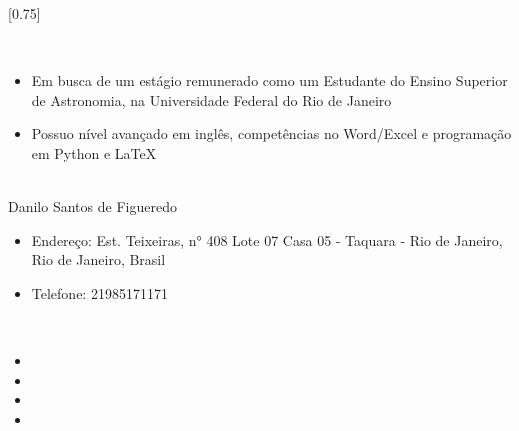 \documentclass[Personalized]{simplehipstercv}
\begin{document}
\setlength{\columnsep}{1.5cm}
[0.75]
\begin{paracol}{2}

\paracolbackgroundoptions



\footnotesize
{\setasidefontcolour
\flushright
\begin{center}
\end{center}

\\[0.5em]

\begin{itemize}
    \item Em busca de um estágio remunerado como um Estudante do Ensino Superior de Astronomia, na Universidade Federal do Rio de Janeiro
    \item Possuo nível avançado em inglês, competências no Word/Excel e programação em Python e LaTeX


\end{itemize}

\bigskip

 \\[0.5em]
Danilo Santos de Figueredo
\begin{itemize}
    \item Endereço: Est. Teixeiras, n° 408 Lote 07 Casa 05 - Taquara - Rio de Janeiro, Rio de Janeiro, Brasil
    \item Telefone: 21985171171

\end{itemize}



\bigskip

 \\[0.5em]

\begin{itemize}
    \item {}
    \item {}
    \item {}
    \item {} 
\end{itemize}

\bigskip



}
\end{paracol}
\end{document}
